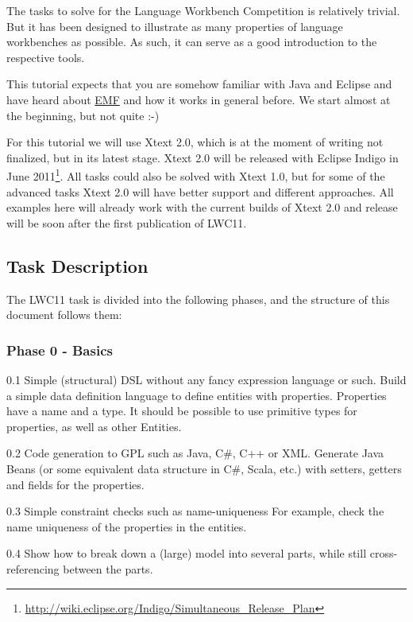 The tasks to solve for the Language Workbench Competition is relatively trivial.
But it has been designed to illustrate as many properties of language
workbenches as possible. As such, it can serve as a good introduction to the
respective tools.

This tutorial expects that you are somehow familiar with Java and Eclipse and
have heard about \url{EMF} and how it works in general before. We start almost at the
beginning, but not quite :-)

For this tutorial we will use Xtext 2.0, which is at the moment of writing not
finalized, but in its latest stage. Xtext 2.0 will be released with Eclipse
Indigo in June
2011\footnote{\url{http://wiki.eclipse.org/Indigo/Simultaneous_Release_Plan}}.
All tasks could also be solved with Xtext 1.0, but for some of the advanced
tasks Xtext 2.0 will have better support and different approaches. All examples
here will already work with the current builds of Xtext 2.0 and
release will be soon after the first publication of LWC11.

\subsection{Task Description}
The LWC11 task is divided into the following phases, and the structure of this
document follows them:

\subsubsection{Phase 0 - Basics}

\begin{compactitem}
    \item 0.1 Simple (structural) DSL without any fancy expression language or
    such. Build a simple data definition language to define entities with
    properties. Properties have a name and a type. It should be possible to use
    primitive types for properties, as well as other Entities.
    \item 0.2 Code generation to GPL such as Java, C\#, C++ or XML. Generate
    Java Beans (or some equivalent data structure in C\#, Scala, etc.) with
    setters, getters and fields for the properties.
    \item 0.3 Simple constraint checks such as name-uniqueness For example,
    check the name uniqueness of the properties in the entities.
    \item 0.4 Show how to break down a (large) model into several parts, while
    still cross-referencing between the parts.
\end{compactitem}

